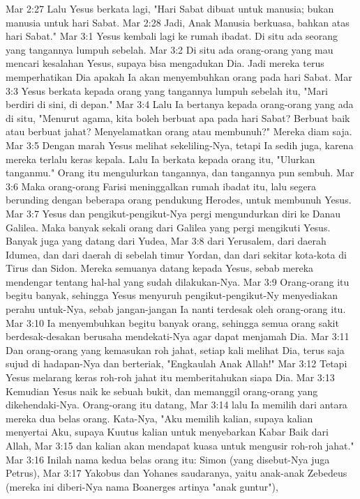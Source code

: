 Mar 2:27  Lalu Yesus berkata lagi, "Hari Sabat dibuat untuk manusia; bukan manusia untuk hari Sabat.
Mar 2:28  Jadi, Anak Manusia berkuasa, bahkan atas hari Sabat."
Mar 3:1  Yesus kembali lagi ke rumah ibadat. Di situ ada seorang yang tangannya lumpuh sebelah.
Mar 3:2  Di situ ada orang-orang yang mau mencari kesalahan Yesus, supaya bisa mengadukan Dia. Jadi mereka terus memperhatikan Dia apakah Ia akan menyembuhkan orang pada hari Sabat.
Mar 3:3  Yesus berkata kepada orang yang tangannya lumpuh sebelah itu, "Mari berdiri di sini, di depan."
Mar 3:4  Lalu Ia bertanya kepada orang-orang yang ada di situ, "Menurut agama, kita boleh berbuat apa pada hari Sabat? Berbuat baik atau berbuat jahat? Menyelamatkan orang atau membunuh?" Mereka diam saja.
Mar 3:5  Dengan marah Yesus melihat sekeliling-Nya, tetapi Ia sedih juga, karena mereka terlalu keras kepala. Lalu Ia berkata kepada orang itu, "Ulurkan tanganmu." Orang itu mengulurkan tangannya, dan tangannya pun sembuh.
Mar 3:6  Maka orang-orang Farisi meninggalkan rumah ibadat itu, lalu segera berunding dengan beberapa orang pendukung Herodes, untuk membunuh Yesus.
Mar 3:7  Yesus dan pengikut-pengikut-Nya pergi mengundurkan diri ke Danau Galilea. Maka banyak sekali orang dari Galilea yang pergi mengikuti Yesus. Banyak juga yang datang dari Yudea,
Mar 3:8  dari Yerusalem, dari daerah Idumea, dan dari daerah di sebelah timur Yordan, dan dari sekitar kota-kota di Tirus dan Sidon. Mereka semuanya datang kepada Yesus, sebab mereka mendengar tentang hal-hal yang sudah dilakukan-Nya.
Mar 3:9  Orang-orang itu begitu banyak, sehingga Yesus menyuruh pengikut-pengikut-Ny menyediakan perahu untuk-Nya, sebab jangan-jangan Ia nanti terdesak oleh orang-orang itu.
Mar 3:10  Ia menyembuhkan begitu banyak orang, sehingga semua orang sakit berdesak-desakan berusaha mendekati-Nya agar dapat menjamah Dia.
Mar 3:11  Dan orang-orang yang kemasukan roh jahat, setiap kali melihat Dia, terus saja sujud di hadapan-Nya dan berteriak, "Engkaulah Anak Allah!"
Mar 3:12  Tetapi Yesus melarang keras roh-roh jahat itu memberitahukan siapa Dia.
Mar 3:13  Kemudian Yesus naik ke sebuah bukit, dan memanggil orang-orang yang dikehendaki-Nya. Orang-orang itu datang,
Mar 3:14  lalu Ia memilih dari antara mereka dua belas orang. Kata-Nya, "Aku memilih kalian, supaya kalian menyertai Aku, supaya Kuutus kalian untuk menyebarkan Kabar Baik dari Allah,
Mar 3:15  dan kalian akan mendapat kuasa untuk mengusir roh-roh jahat."
Mar 3:16  Inilah nama kedua belas orang itu: Simon (yang disebut-Nya juga Petrus),
Mar 3:17  Yakobus dan Yohanes saudaranya, yaitu anak-anak Zebedeus (mereka ini diberi-Nya nama Boanerges artinya "anak guntur"),
